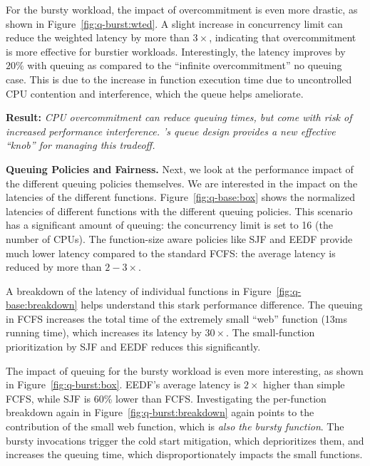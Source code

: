 For the bursty workload, the impact of overcommitment is even more drastic, as shown in Figure~\ref{fig:q-burst:wted}.
A slight increase in concurrency limit can reduce the weighted latency by more than $3\times$, indicating that overcommitment is more effective for burstier workloads.
Interestingly, the latency improves by $20\%$ with queuing as compared to the ``infinite overcommitment'' no queuing case.
This is due to the increase in function execution time due to uncontrolled CPU contention and interference, which the queue helps ameliorate. 

\noindent \textbf{Result:} \emph{CPU overcommitment can reduce queuing times, but come with risk of increased performance interference. \sysname's queue design  provides a new effective ``knob'' for managing this tradeoff.}


\noindent \textbf{Queuing Policies and Fairness.}
Next, we look at the performance impact of the different queuing policies themselves.
We are interested in the impact on the latencies of the different functions. 
Figure~\ref{fig:q-base:box} shows the normalized latencies of different functions with the different queuing policies.
This scenario has a significant amount of queuing: the concurrency limit is set to 16 (the number of CPUs). 
The function-size aware policies like SJF and EEDF provide much lower latency compared to the standard FCFS: the average latency is reduced by more than $2-3\times$. %

A breakdown of the latency of individual functions in Figure~\ref{fig:q-base:breakdown} helps understand this stark performance difference.
The queuing in FCFS increases the total time of the extremely small ``web'' function (13ms running time), which increases its latency by $30\times$.
The small-function prioritization by SJF and EEDF reduces this significantly. 

The impact of queuing for the bursty workload is even more interesting, as shown in Figure~\ref{fig:q-burst:box}.
EEDF's average latency is $2\times$ higher than simple FCFS, while SJF is 60\% lower than FCFS. 
Investigating the per-function breakdown again in Figure~\ref{fig:q-burst:breakdown} again points to the contribution of the small web function, which is \emph{also the bursty function}.
The bursty invocations trigger the cold start mitigation, which deprioritizes them, and increases the queuing time, which disproportionately impacts the small functions.


